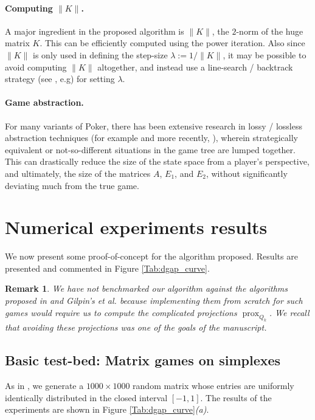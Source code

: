 \documentclass[a4paper,9pt]{extarticle}
\DeclareMathOperator{\prox}{prox}
\newtheorem{remark}{Remark}
\begin{document}
\paragraph*{Computing $\|K\|$.}
A major ingredient in the proposed algorithm is $\|K\|$, the $2$-norm
of the huge matrix $K$. This  can be efficiently computed using the
power iteration. Also since $\|K\|$ is only used in defining the
step-size $\lambda := 1/\|K\|$, it may be possible to avoid computing
$\|K\|$ altogether, and instead use a line-search / backtrack strategy
(see \cite{o2013adaptive}, e.g) for setting $\lambda$.

\paragraph*{Game abstraction.} For many variants of Poker, there has
been extensive research in lossy / lossless abstraction techniques (for
example \cite{gilpin2007} and more recently,
\cite{sandholm2015abstraction,brown2015hierarchical}), wherein
strategically equivalent or not-so-different situations in the game
tree are lumped together. This can drastically reduce the size of the
state space from a player's perspective, and ultimately, the size of
the matrices $A$, $E_1$, and $E_2$, without significantly deviating
much from the true game.

\section{Numerical experiments results}
\label{sec:results}
We now present some proof-of-concept for the algorithm proposed.
Results are presented and commented in Figure \ref{Tab:dgap_curve}.
\begin{remark}
\label{thm:bulletproof}
We have not benchmarked our algorithm against the algorithms proposed in
\cite{nesterov2005a} and Gilpin's et al. \cite{gilpinfirst} because
implementing them from scratch for such games would require us to
compute the complicated projections $\prox_{Q_k}$. We recall that
avoiding these projections was one of the goals of the manuscript.
\end{remark}
\subsection{Basic test-bed: Matrix games on simplexes}
As in \cite{nesterov2005a,chambolle2014ergodic}, we generate a $1000
\times 1000$ random matrix whose entries are uniformly identically
distributed in the closed interval $[-1, 1]$. %
The results of the experiments are shown in Figure
\ref{Tab:dgap_curve}\textit{(a)}.
\end{document}
